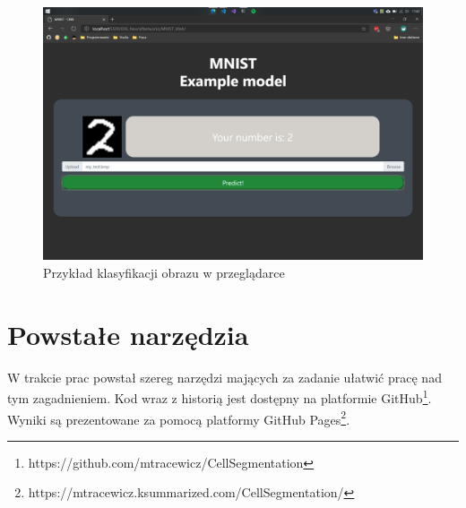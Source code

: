\documentclass{article}
\begin{document}
\begin{figure}[H]
    \centering
    \includegraphics[width=\linewidth]{images/mnist.png}
    \caption{Przykład klasyfikacji obrazu w przeglądarce}
    \label{fig:mnist}
\end{figure}
\newpage
\section{Powstałe narzędzia}
W trakcie prac powstał szereg narzędzi mających za zadanie ułatwić pracę nad tym zagadnieniem.
Kod wraz z historią jest dostępny na platformie GitHub\footnote{https://github.com/mtracewicz/CellSegmentation}.
Wyniki są prezentowane za pomocą platformy GitHub Pages\footnote{https://mtracewicz.ksummarized.com/CellSegmentation/}.
\end{document}
